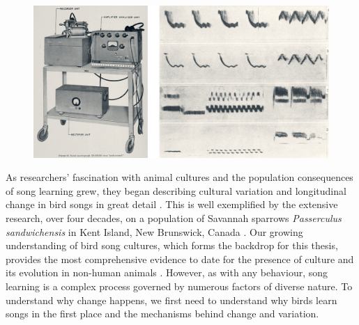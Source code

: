 \begin{figure}[bh!]
    \centering
    \includegraphics[width=\linewidth]{figures/chapter_1/spectrograph.png}
    \label{c1_fig:spectrograph}
\end{figure}


As researchers’ fascination with animal cultures and the population consequences of song learning grew, they began describing cultural variation and longitudinal change in bird songs in great detail \parencite{nelson2017, zimmerman2016, zann1993, baptista1977, lachlan2003a}. This is well exemplified by the extensive research, over four decades, on a population of Savannah sparrows \textit{Passerculus sandwichensis} in Kent Island, New Brunswick, Canada \autocite{williams2013, mennill2018, williams2019, hensel2022, dixon1978}. Our growing understanding of bird song cultures, which forms the backdrop for this thesis, provides the most comprehensive evidence to date for the presence of culture and its evolution in non-human animals \autocite{slater2003a, aplin2019}. However, as with any behaviour, song learning is a complex process governed by numerous factors of diverse nature. To understand why change happens, we first need to understand why birds learn songs in the first place and the mechanisms behind change and variation.

